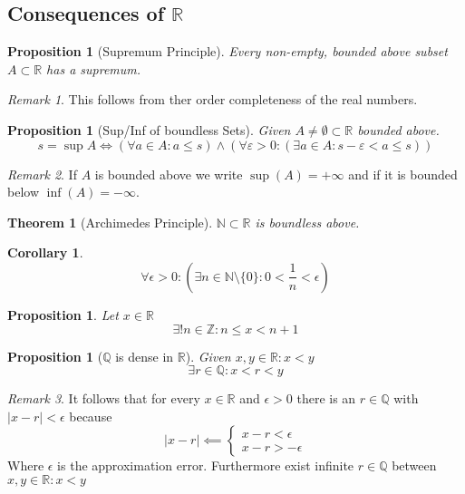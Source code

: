 \documentclass[english,titlepage]{uzhpub}
\theoremstyle{definition}
\theoremstyle{plain}
\newtheorem{proposition}[definition]{Proposition}
\newtheorem{theorem}[definition]{Theorem} %
\newtheorem{corollary}{Corollary}[theorem]
\theoremstyle{remark}
\newtheorem*{remark}{Remark}
\theoremstyle{example}
\begin{document}
   \subsection{Consequences of \texorpdfstring{\(\mathbb{R}\)}{R}}
   \begin{proposition}[Supremum Principle]\label{pro:supremum}
      Every non-empty, bounded above subset \(A \subset \mathbb{R}\) has a supremum.
   \end{proposition}
   \begin{remark}
      This follows from ther order completeness of the real numbers.
   \end{remark}

   \begin{proposition}[Sup/Inf of boundless Sets]\label{pro:supremum_epsilon}
      Given \(A \neq \emptyset \subset \mathbb{R}\) bounded above.
      \[s = \sup A \iff (\forall a \in A: a \leq s) \land (\forall \varepsilon > 0: (\exists a \in A: s - \varepsilon < a \leq s))\]
   \end{proposition}
   \begin{remark}
      If \(A\) is bounded above we write \(\sup(A) = +\infty\) and if it is bounded below \(\inf(A) = -\infty\).
   \end{remark}

   \begin{theorem}[Archimedes Principle]\label{thm:archimedes}
      \(\mathbb{N} \subset \mathbb{R}\) is boundless above.
   \end{theorem}

   \begin{corollary}\label{cor:arch}
      \[\forall \epsilon > 0: \left(\exists n \in \mathbb{N} \setminus \{0\}: 0 < \frac{1}{n} < \epsilon \right)\]
   \end{corollary}

   \begin{proposition}\label{pro:surrounding_n}
      Let \(x \in \mathbb{R}\)
      \[\exists! n \in \mathbb{Z}: n \leq x < n + 1\]
   \end{proposition}

   \begin{proposition}[\(\mathbb{Q}\) is dense in \(\mathbb{R}\)]\label{pro:Q_density}
      Given \(x, y \in \mathbb{R}: x < y\)
      \[\exists r \in \mathbb{Q}: x < r < y\]
   \end{proposition}
   \begin{remark}
      It follows that for every \(x \in \mathbb{R}\) and \(\epsilon > 0\) there is an \(r \in \mathbb{Q}\) with \(|x - r| < \epsilon\) because
      \[|x - r| \impliedby \begin{cases} x - r < \epsilon\\ x - r > - \epsilon \end{cases}\]
      Where \(\epsilon\) is the approximation error.
      Furthermore exist infinite \(r \in \mathbb{Q}\) between \(x, y \in \mathbb{R}: x < y\)
   \end{remark}
\end{document}
